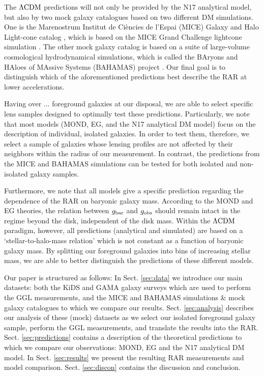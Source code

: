 \documentclass[fleqn,usenatbib]{mnras}
\newcommand{\lcdm}{{\rm \Lambda CDM}}
\newcommand{\un}[1]{_{\rm #1}}
\begin{document}
The $\lcdm$ predictions will not only be provided by the N17 analytical model, but also by two mock galaxy catalogues based on two different DM simulations. One is the Marenostrum Institut de Ci{\`e}ncies de l'Espai (MICE) Galaxy and Halo Light-cone catalog \cite[]{carretero2015,hoffmann2015}, which is based on the MICE Grand Challenge lightcone simulation \cite[MICE-GC,][]{fosalba2015a,fosalba2015b,crocce2015}. The other mock galaxy catalog is based on a suite of large-volume cosmological hydrodynamical simulations, which is called the BAryons and HAloes of MAssive Systems (BAHAMAS) project \cite[]{mccarthy2017}. Our final goal is to distinguish which of the aforementioned predictions best describe the RAR at lower accelerations.

Having over ... foreground galaxies at our disposal, we are able to select specific lens samples designed to optimally test these predictions. Particularly, we note that most models (MOND, EG, and the N17 analytical DM model) focus on the description of individual, isolated galaxies. In order to test them, therefore, we select a sample of galaxies whose lensing profiles are not affected by their neighbors within the radius of our measurement. In contrast, the predictions from the MICE and BAHAMAS simulations can be tested for both isolated and non-isolated galaxy samples.

Furthermore, we note that all models give a specific prediction regarding the dependence of the RAR on baryonic galaxy mass. According to the MOND and EG theories, the relation between $g\un{bar}$ and $g\un{obs}$ should remain intact in the regime beyond the disk, independent of the disk mass. Within the $\lcdm$ paradigm, however, all predictions (analytical and simulated) are based on a `stellar-to-halo-mass relation' which is not constant as a function of baryonic galaxy mass. By splitting our foreground galaxies into bins of increasing stellar mass, we are able to better distinguish the predictions of these different models.

Our paper is structured as follows: In Sect. \ref{sec:data} we introduce our main datasets: both the KiDS and GAMA galaxy surveys which are used to perform the GGL measurements, and the MICE and BAHAMAS simulations \& mock galaxy catalogues to which we compare our results. Sect. \ref{sec:analysis} describes our analysis of these (mock) datasets as we select our isolated foreground galaxy sample, perform the GGL measurements, and translate the results into the RAR. Sect. \ref{sec:predictions} contains a description of the theoretical predictions to which we compare our observations: MOND, EG and the N17 analytical DM model. In Sect. \ref{sec:results} we present the resulting RAR measurements and model comparison. Sect. \ref{sec:discon} contains the discussion and conclusion.
\end{document}
